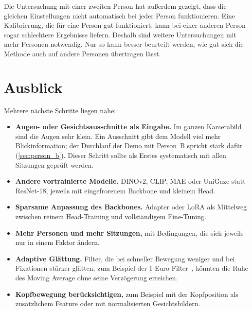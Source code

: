 Die Untersuchung mit einer zweiten Person hat außerdem gezeigt, dass die
gleichen Einstellungen nicht automatisch bei jeder Person funktionieren. Eine
Kalibrierung, die für eine Person gut funktioniert, kann bei einer anderen
Person sogar schlechtere Ergebnisse liefern. Deshalb sind weitere
Untersuchungen mit mehr Personen notwendig. Nur so kann besser beurteilt
werden, wie gut sich die Methode auch auf andere Personen übertragen lässt.

\section{Ausblick}
\label{sec:ausblick}
Mehrere nächste Schritte liegen nahe:
\begin{itemize}
  \item \textbf{Augen- oder Gesichtsausschnitte als Eingabe.} Im ganzen
        Kamerabild sind die Augen sehr klein. Ein Ausschnitt gibt dem Modell
        viel mehr Blickinformation; der Durchlauf der Demo mit Person~B spricht
        stark dafür (\cref{sec:person_b}). Dieser Schritt sollte als Erstes
        systematisch mit allen Sitzungen geprüft werden.
  \item \textbf{Andere vortrainierte Modelle.} DINOv2, CLIP, MAE oder UniGaze
        statt ResNet-18, jeweils mit eingefrorenem Backbone und kleinem Head.
  \item \textbf{Sparsame Anpassung des Backbones.} Adapter oder LoRA als
        Mittelweg zwischen reinem Head-Training und vollständigem Fine-Tuning.
  \item \textbf{Mehr Personen und mehr Sitzungen,} mit Bedingungen, die sich
        jeweils nur in einem Faktor ändern.
  \item \textbf{Adaptive Glättung.} Filter, die bei schneller Bewegung
        weniger und bei Fixationen stärker glätten, zum Beispiel der
        1-Euro-Filter~\cite{casiez2012oneeuro}, könnten die Ruhe des Moving
        Average ohne seine Verzögerung erreichen.
  \item \textbf{Kopfbewegung berücksichtigen,} zum Beispiel mit der
        Kopfposition als zusätzlichem Feature oder mit normalisierten
        Gesichtsbildern.
\end{itemize}

